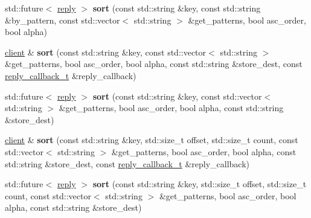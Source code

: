 \begin{DoxyCompactItemize}
\item 
\mbox{\label{classcpp__redis_1_1client_a5bb3d0f1cedc6cd43a5fb3b8d9574d49}} 
std\+::future$<$ \hyperlink{classcpp__redis_1_1reply}{reply} $>$ {\bfseries sort} (const std\+::string \&key, const std\+::string \&by\+\_\+pattern, const std\+::vector$<$ std\+::string $>$ \&get\+\_\+patterns, bool asc\+\_\+order, bool alpha)
\item 
\mbox{\label{classcpp__redis_1_1client_a583854ebe329581c018441047896cfbc}} 
\hyperlink{classcpp__redis_1_1client}{client} \& {\bfseries sort} (const std\+::string \&key, const std\+::vector$<$ std\+::string $>$ \&get\+\_\+patterns, bool asc\+\_\+order, bool alpha, const std\+::string \&store\+\_\+dest, const \hyperlink{classcpp__redis_1_1client_a061a1140d36d2eaeda82b09a0bb3f9f2}{reply\+\_\+callback\+\_\+t} \&reply\+\_\+callback)
\item 
\mbox{\label{classcpp__redis_1_1client_a0c2af4e5e21c67a104473c9e9032433c}} 
std\+::future$<$ \hyperlink{classcpp__redis_1_1reply}{reply} $>$ {\bfseries sort} (const std\+::string \&key, const std\+::vector$<$ std\+::string $>$ \&get\+\_\+patterns, bool asc\+\_\+order, bool alpha, const std\+::string \&store\+\_\+dest)
\item 
\mbox{\label{classcpp__redis_1_1client_aa60a5fe91d29d4399dfbea43eb039d67}} 
\hyperlink{classcpp__redis_1_1client}{client} \& {\bfseries sort} (const std\+::string \&key, std\+::size\+\_\+t offset, std\+::size\+\_\+t count, const std\+::vector$<$ std\+::string $>$ \&get\+\_\+patterns, bool asc\+\_\+order, bool alpha, const std\+::string \&store\+\_\+dest, const \hyperlink{classcpp__redis_1_1client_a061a1140d36d2eaeda82b09a0bb3f9f2}{reply\+\_\+callback\+\_\+t} \&reply\+\_\+callback)
\item 
\mbox{\label{classcpp__redis_1_1client_a562cbda21fed71475dcd49736aaf2d4d}} 
std\+::future$<$ \hyperlink{classcpp__redis_1_1reply}{reply} $>$ {\bfseries sort} (const std\+::string \&key, std\+::size\+\_\+t offset, std\+::size\+\_\+t count, const std\+::vector$<$ std\+::string $>$ \&get\+\_\+patterns, bool asc\+\_\+order, bool alpha, const std\+::string \&store\+\_\+dest)
\item 
\mbox{\label{classcpp__redis_1_1client_aa91b9a98ca759b399fb0b44f2c08ac1c}} 

\end{DoxyCompactItemize}
